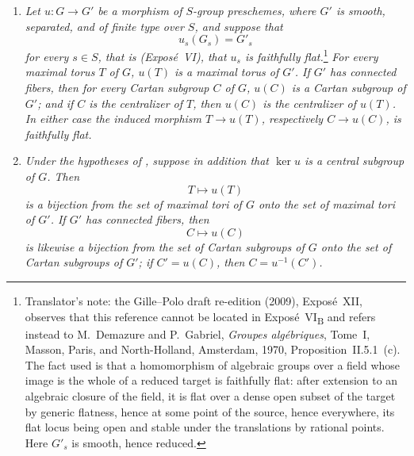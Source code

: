 \begin{enumerate}
\item[\emph{\SGAInlineRefTarget{sga3:xii:7.1:item:e}(e)}] \emph{Let \(u:G\to G'\) be a morphism of
\(S\)-group preschemes, where \(G'\) is smooth, separated, and of
finite type over \(S\), and suppose that}
\[
  u_s(G_s)=G'_s
\]
\emph{for every \(s\in S\), that is \textup{(Exposé~VI)}, that \(u_s\) is faithfully
flat.}\footnote{Translator's note: the Gille--Polo draft re-edition (2009),
Exposé~XII, observes that this reference cannot be located in
Exposé~VI\textsubscript{B} and refers instead to M.~Demazure and P.~Gabriel,
\emph{Groupes algébriques}, Tome~I, Masson, Paris, and North-Holland,
Amsterdam, 1970, Proposition~II.5.1~(c). The fact used is that a
homomorphism of algebraic groups over a field whose image is the whole of a
reduced target is faithfully flat: after extension to an algebraic closure
of the field, it is flat over a dense open subset of the target by generic
flatness, hence at some point of the source, hence everywhere, its flat
locus being open and stable under the translations by rational points. Here
\(G'_s\) is smooth, hence reduced.} \emph{For every maximal torus \(T\) of \(G\),
\(u(T)\) is a maximal torus of \(G'\). If \(G'\) has connected
fibers, then for every Cartan subgroup \(C\) of \(G\), \(u(C)\) is a
Cartan subgroup of \(G'\); and if \(C\) is the centralizer of \(T\),
then \(u(C)\) is the centralizer of \(u(T)\). In either case the
induced morphism \(T\to u(T)\), respectively \(C\to u(C)\), is
faithfully flat.}

\item[\emph{\SGAInlineRefTarget{sga3:xii:7.1:item:f}(f)}] \emph{Under the hypotheses of \textup{}, suppose
in addition that \(\ker u\) is a central subgroup of \(G\). Then}
\[
  T\longmapsto u(T)
\]
\emph{is a bijection from the set of maximal tori of \(G\) onto the
set of maximal tori of \(G'\). If \(G'\) has connected fibers, then}
\[
  C\longmapsto u(C)
\]
\emph{is likewise a bijection from the set of Cartan subgroups of
\(G\) onto the set of Cartan subgroups of \(G'\); if \(C'=u(C)\),
then \(C=u^{-1}(C')\).}
\end{enumerate}


